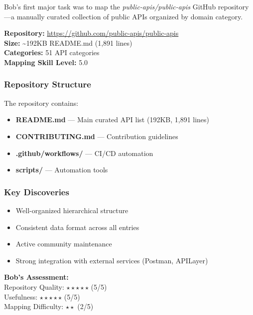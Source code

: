 \documentclass[11pt,letterpaper]{article}
\begin{document}
Bob's first major task was to map the \textit{public-apis/public-apis} GitHub repository---a manually curated collection of public APIs organized by domain category.

\begin{highlightbox}
\textbf{Repository:} \url{https://github.com/public-apis/public-apis}\\
\textbf{Size:} \textasciitilde 192KB README.md (1,891 lines)\\
\textbf{Categories:} 51 API categories\\
\textbf{Mapping Skill Level:} 5.0
\end{highlightbox}

\subsubsection{Repository Structure}

The repository contains:
\begin{itemize}[leftmargin=*]
    \item \textbf{README.md} --- Main curated API list (192KB, 1,891 lines)
    \item \textbf{CONTRIBUTING.md} --- Contribution guidelines
    \item \textbf{.github/workflows/} --- CI/CD automation
    \item \textbf{scripts/} --- Automation tools
\end{itemize}

\subsubsection{Key Discoveries}
\begin{itemize}[leftmargin=*]
    \item Well-organized hierarchical structure
    \item Consistent data format across all entries
    \item Active community maintenance
    \item Strong integration with external services (Postman, APILayer)
\end{itemize}

\begin{highlightbox}
\textbf{Bob's Assessment:}\\
Repository Quality: $\star\star\star\star\star$ (5/5)\\
Usefulness: $\star\star\star\star\star$ (5/5)\\
Mapping Difficulty: $\star\star$ (2/5)
\end{highlightbox}
\end{document}
